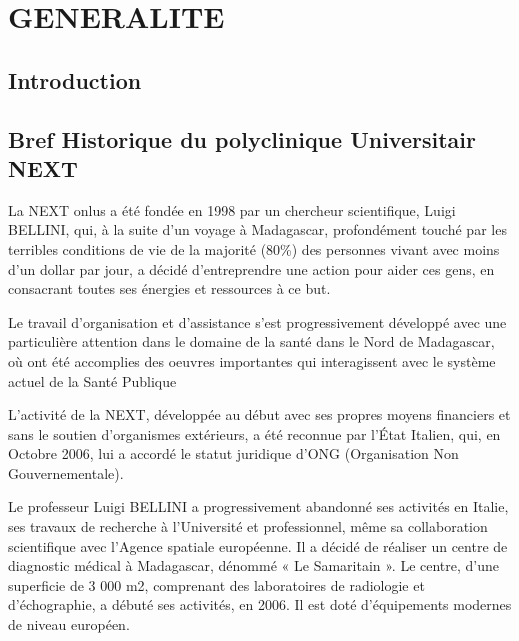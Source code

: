 \chapter{GENERALITE}
\minitoc
\newpage
\section{Introduction}

	\section{Bref Historique du polyclinique Universitair NEXT}
  	
  	La NEXT onlus a été fondée en 1998 par un chercheur scientifique, Luigi BELLINI, qui, à la
  	suite d'un voyage à Madagascar, profondément touché par les terribles conditions de vie de
  	la majorité (80\%) des personnes vivant avec moins d'un dollar par jour, a décidé
  	d'entreprendre une action pour aider ces gens, en consacrant toutes ses énergies et
  	ressources à ce but.
  	\medskip
  	
  	Le travail d'organisation et d'assistance s'est progressivement développé avec une
  	particulière attention dans le domaine de la santé dans le Nord de Madagascar, où ont été
  	accomplies des oeuvres importantes qui interagissent avec le système actuel de la Santé
  	Publique
  	\medskip
  	
  	L'activité de la NEXT, développée au début avec ses propres moyens financiers et sans le
  	soutien d'organismes extérieurs, a été reconnue par l'État Italien, qui, en Octobre 2006, lui a
  	accordé le statut juridique d'ONG (Organisation Non Gouvernementale).
  	\medskip
  	
  	Le professeur Luigi BELLINI a progressivement abandonné ses activités en Italie, ses
  	travaux de recherche à l'Université et professionnel, même sa collaboration scientifique avec
  	l'Agence spatiale européenne. Il a décidé de réaliser un centre de diagnostic médical à
  	Madagascar, dénommé « Le Samaritain ». Le centre, d'une superficie de 3 000 m2,
  	comprenant des laboratoires de radiologie et d'échographie, a débuté ses activités, en 2006.
  	Il est doté d'équipements modernes de niveau européen.
  	\medskip
  	

